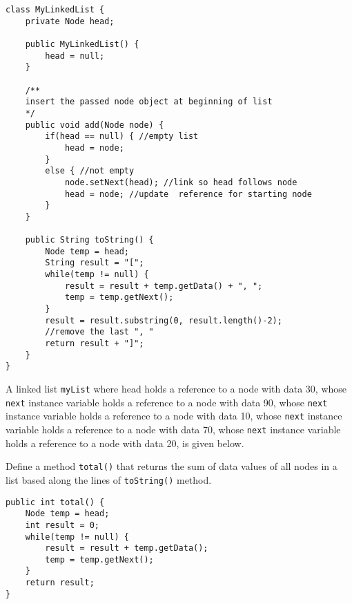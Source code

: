 \begin{lstlisting}[linewidth=15.5cm]
class MyLinkedList {
	private Node head;
	
	public MyLinkedList() {
		head = null;
	}
	
	/**
	insert the passed node object at beginning of list
	*/
	public void add(Node node) {
		if(head == null) { //empty list
			head = node; 
		}
		else { //not empty
			node.setNext(head); //link so head follows node
			head = node; //update  reference for starting node
		}
	}
	
	public String toString() {
		Node temp = head;
		String result = "[";
		while(temp != null) {
			result = result + temp.getData() + ", ";
			temp = temp.getNext();
		}
		result = result.substring(0, result.length()-2); 
		//remove the last ", "
		return result + "]";
	}
}
\end{lstlisting}

A linked list \texttt{myList} where head holds a reference to a node with data 30, whose \texttt{next} instance variable holds a reference to a node with data 90, whose \texttt{next} instance variable holds a reference to a node with data 10, whose \texttt{next} instance variable holds a reference to a node with data 70, whose \texttt{next} instance variable holds a reference to a node with data 20, is given below.

\vskip 0.5cm

\bgroup \tikzset{png export}  \egroup

\begin{exercise}[5]
Define a method \texttt{total()} that returns the sum of data values of all nodes in a list based along the lines of \texttt{toString()} method.	
\end{exercise}
\begin{answer}
\begin{lstlisting}
public int total() {
	Node temp = head;
	int result = 0;
	while(temp != null) {
		result = result + temp.getData();
		temp = temp.getNext();
	}
	return result;
}
\end{lstlisting}	
\end{answer}

